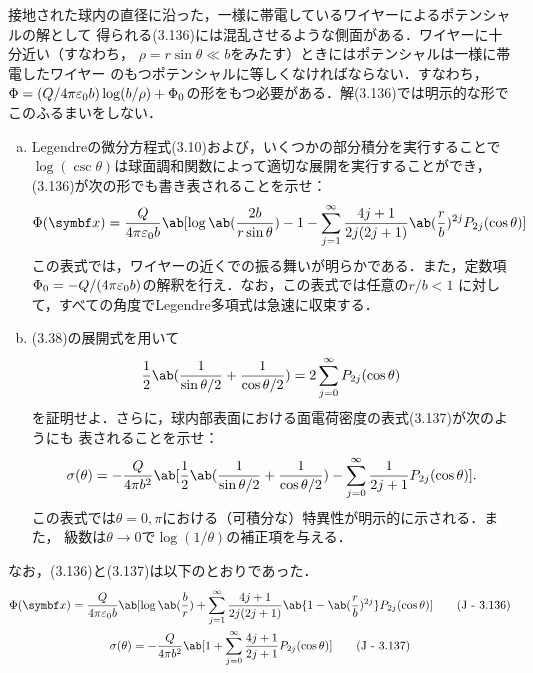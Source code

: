 \begin{bx1}
  接地された球内の直径に沿った，一様に帯電しているワイヤーによるポテンシャルの解として
  得られる(3.136)には混乱させるような側面がある．ワイヤーに十分近い（すなわち，
  $\rho = r\sin\theta \ll b$をみたす）ときにはポテンシャルは一様に帯電したワイヤー
  のもつポテンシャルに等しくなければならない．すなわち，$\Phi = (Q/4\pi\varepsilon_0b)\log(b/\rho) + \Phi_0$の形をもつ必要がある．解(3.136)では明示的な形でこのふるまいをしない．
  \begin{enumerate}[(a)]%
    \item Legendreの微分方程式(3.10)および，いくつかの部分積分を実行することで
      $\log(\csc\theta)$は球面調和関数によって適切な展開を実行することができ，
      (3.136)が次の形でも書き表されることを示せ：
      \begin{gather}%
        \Phi(\bs{x})  = \frac{Q}{4\pi\eps_0 b}\ab[\log\ab(\frac{2b}{r\sin\theta}) - 1 - 
        \sum_{j=1}^\infty\frac{4j+1}{2j(2j+1)} \ab(\frac rb)^{2j} P_{2j}(\cos\theta)
        ]
      \end{gather}%
      この表式では，ワイヤーの近くでの振る舞いが明らかである．また，定数項
      $\Phi_0 = -Q/(4\pi \varepsilon_0 b)$の解釈を行え．なお，この表式では任意の$r / b < 1$
      に対して，すべての角度でLegendre多項式は急速に収束する．
    \item (3.38)の展開式を用いて
      \begin{gather}%
        \frac{1}{2} \ab(\frac{1}{\sin\theta/2} + \frac{1}{\cos\theta/2}) = 2 \sum_{j=0}^\infty P_{2j}(\cos\theta)
      \end{gather}%
      を証明せよ．さらに，球内部表面における面電荷密度の表式(3.137)が次のようにも
      表されることを示せ：
      \begin{gather}%
        \sigma(\theta) = - \frac{Q}{4\pi b^2} \ab[\frac{1}{2}\ab(\frac{1}{\sin\theta/2} + \frac{1}{\cos\theta/2}) - \sum_{j=0}^\infty \frac{1}{2j+1}P_{2j}(\cos\theta)].
      \end{gather}%
      この表式では$\theta = 0, \pi$における（可積分な）特異性が明示的に示される．また，
      級数は$\theta \to 0$で$\log(1/\theta)$の補正項を与える．
  \end{enumerate}%
  \tcblower
  なお，(3.136)と(3.137)は以下のとおりであった．
  \begin{gather}%
    \Phi(\bs{x}) = \frac{Q}{4\pi\eps_0 b}\ab[\log \ab(\frac br) +\sum_{j=1}^\infty \frac{4j+1}{2j(2j+1)} \ab\{1- \ab(\frac rb)^{2j}\}P_{2j}(\cos\theta)] \tag{J - 3.136}\\
    \sigma(\theta) = -\frac{Q}{4\pi b^2}\ab[1 + \sum_{j=0}^\infty \frac{4j+1}{2j+1}P_{2j}(\cos\theta)] \tag{J - 3.137}
  \end{gather}%

\end{bx1}

